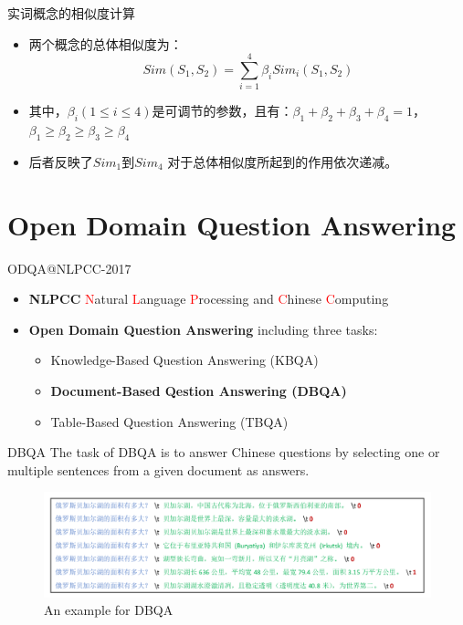 \documentclass[aspectratio=169]{beamer} %
\begin{document}
    \begin{frame}{实词概念的相似度计算}
      \begin{itemize}
        \item 两个概念的总体相似度为：
        \begin{equation}
          Sim(S_1, S_2) = \sum_{i=1}^4 {\beta}_i Sim_i(S_1, S_2)
        \end{equation}
        \item 其中，${\beta}_i (1 \leq i \leq 4)$是可调节的参数，且有：${\beta}_1+{\beta}_2+{\beta}_3+{\beta}_4=1$，${\beta}_1 \geq {\beta}_2 \geq {\beta}_3 \geq {\beta}_4$
        \item 后者反映了$Sim_1$到$Sim_4$ 对于总体相似度所起到的作用依次递减。
    \end{itemize}
    \end{frame}

  \section{Open Domain Question Answering}
  \begin{frame}{ODQA@NLPCC-2017}
    \begin{itemize}
    \item \textbf{NLPCC} \newline
    \textcolor{red}{N}atural \textcolor{red}{L}anguage \textcolor{red}{P}rocessing and \textcolor{red}{C}hinese \textcolor{red}{C}omputing \newline 
    \item \textbf{Open Domain Question Answering} \newline
    including three tasks:
      \begin{itemize}
        \item Knowledge-Based Question Answering (KBQA)
        \item \textbf{Document-Based Qestion Answering (DBQA)}
        \item Table-Based Question Answering (TBQA)
      \end{itemize}
    \end{itemize} 
  \end{frame}

  \begin{frame}{DBQA}
    The task of DBQA is to answer Chinese questions by selecting one or multiple sentences from a given document as answers. \newline
    \begin{center}
      \begin{figure}
      \includegraphics[width=\textwidth,height=\textheight,keepaspectratio]{dbqa-example.png}
      \caption{An example for DBQA}
      \end{figure}
    \end{center}
  \end{frame}
\end{document}
